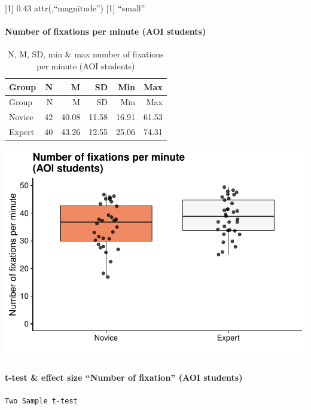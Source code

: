 \documentclass[
]{article}
\begin{document}
{[}1{]} 0.43 attr(,``magnitude'') {[}1{]} ``small''

\paragraph{Number of fixations per minute (AOI
students)}\label{number-of-fixations-per-minute-aoi-students}

\begin{longtable}[]{@{}lrrrrr@{}}
\caption{N, M, SD, min \& max number of fixations per minute (AOI
students)}\tabularnewline
\toprule\noalign{}
Group & N & M & SD & Min & Max \\
\midrule\noalign{}
\endfirsthead
\toprule\noalign{}
Group & N & M & SD & Min & Max \\
\midrule\noalign{}
\endhead
\bottomrule\noalign{}
\endlastfoot
Novice & 42 & 40.08 & 11.58 & 16.91 & 61.53 \\
Expert & 40 & 43.26 & 12.55 & 25.06 & 74.31 \\
\end{longtable}

\includegraphics{expertise_2024_09_26_no_outlierdetection_MK_files/figure-latex/nof_students-1.pdf}

\paragraph{t-test \& effect size ``Number of fixation'' (AOI
students)}\label{t-test-effect-size-number-of-fixation-aoi-students}

\begin{verbatim}
Two Sample t-test
\end{verbatim}
\end{document}
